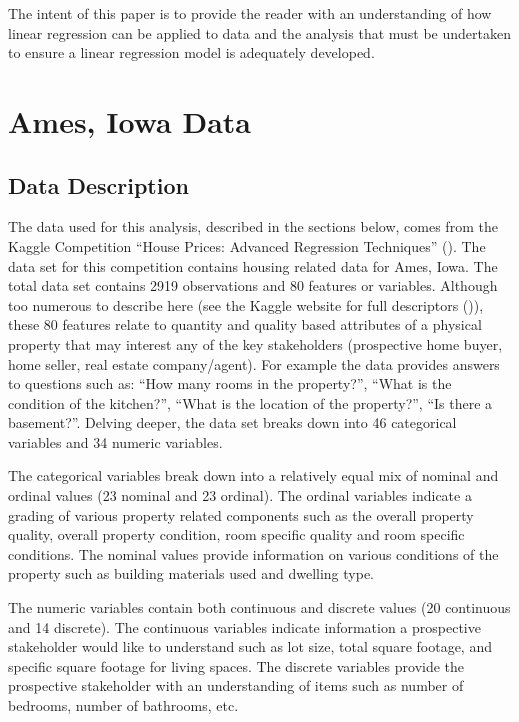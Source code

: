 \documentclass[american,]{article}
\begin{document}
The intent of this paper is to provide the reader with an understanding
of how linear regression can be applied to data and the analysis that
must be undertaken to ensure a linear regression model is adequately
developed.

\section{Ames, Iowa Data}\label{ames-iowa-data}

\subsection{Data Description}\label{data-description}

The data used for this analysis, described in the sections below, comes
from the Kaggle Competition ``House Prices: Advanced Regression
Techniques'' (\citet{Kaggle2016}). The data set for this competition
contains housing related data for Ames, Iowa. The total data set
contains 2919 observations and 80 features or variables. Although too
numerous to describe here (see the Kaggle website for full descriptors
(\citet{Kaggle2016})), these 80 features relate to quantity and quality
based attributes of a physical property that may interest any of the key
stakeholders (prospective home buyer, home seller, real estate
company/agent). For example the data provides answers to questions such
as: ``How many rooms in the property?'', ``What is the condition of the
kitchen?'', ``What is the location of the property?'', ``Is there a
basement?''. Delving deeper, the data set breaks down into 46
categorical variables and 34 numeric variables.

The categorical variables break down into a relatively equal mix of
nominal and ordinal values (23 nominal and 23 ordinal). The ordinal
variables indicate a grading of various property related components such
as the overall property quality, overall property condition, room
specific quality and room specific conditions. The nominal values
provide information on various conditions of the property such as
building materials used and dwelling type. \citet{DeCock2011}

The numeric variables contain both continuous and discrete values (20
continuous and 14 discrete). The continuous variables indicate
information a prospective stakeholder would like to understand such as
lot size, total square footage, and specific square footage for living
spaces. The discrete variables provide the prospective stakeholder with
an understanding of items such as number of bedrooms, number of
bathrooms, etc. \citet{DeCock2011}
\end{document}
